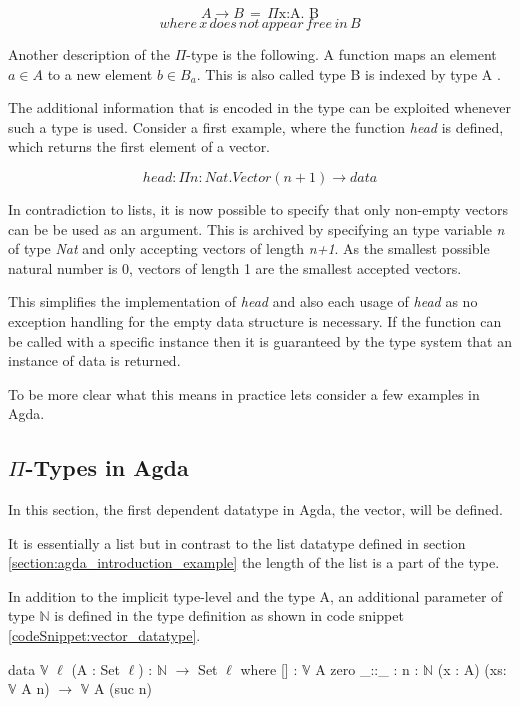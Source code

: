 $$A \rightarrow B \, = \, \Pi \text{x:A. B}$$
$$where \, x \, does \, not \, appear \, free \, in \, B$$

Another description of the $\Pi$-type is the following. A function maps an element $a \in A$ to a new element $b \in B_a$. 
This is also called type B is indexed by type A \cite{10.1145/2841316}.


The additional information that is encoded in the type can be exploited whenever such a type is used. 
Consider a first example, where the function \emph{head} is defined, which returns the first element of a vector.

$$head : \Pi n : Nat.Vector(n+1) \rightarrow data$$

In contradiction to lists, it is now possible to specify that only non-empty vectors can be be used as an argument. 
This is archived by specifying an type variable \emph{n} of type \emph{Nat} and only accepting vectors of length \emph{n+1}.
As the smallest possible natural number is 0, vectors of length 1 are the smallest accepted vectors.

This simplifies the implementation of \emph{head} and also each usage of \emph{head} as no exception handling for the empty data structure is necessary. 
If the function can be called with a specific instance then it is guaranteed by the type system that an instance of data is returned.


To be more clear what this means in practice lets consider a few examples in Agda.

\subsection{$\Pi$-Types in Agda}\label{section_dependent_types_example}
In this section, the first dependent datatype in Agda, the vector, will be defined.

It is essentially a list but in contrast to the list datatype defined in section \ref{section:agda_introduction_example} the length of the list is a part of the type.

In addition to the implicit type-level and the type A, an additional parameter of type $\mathbb{N}$ is defined in the type definition as shown in code snippet \ref{codeSnippet:vector_datatype}.

\begin{codesnippet}[mathescape=true, caption={Definition of the vector datatype in Agda}, label={codeSnippet:vector_datatype}]
data $\mathbb{V}$ {$\ell$} (A : Set $\ell$) : $\mathbb{N}$ $\rightarrow$ Set $\ell$ where
  [] : $\mathbb{V}$ A zero
  _::_ : {n : $\mathbb{N}$} (x : A) (xs: $\mathbb{V}$ A n) $\rightarrow$
         $\mathbb{V}$ A (suc n)
\end{codesnippet}

